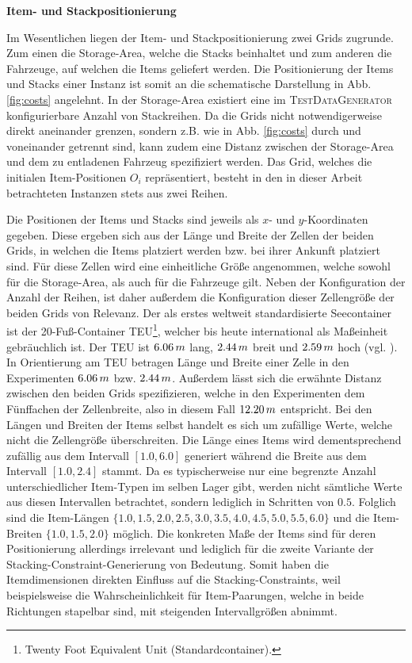 \textbf{Item- und Stackpositionierung}
\label{sec:item_stack_positioning}

Im Wesentlichen liegen der Item- und Stackpositionierung zwei Grids zugrunde. Zum einen die Storage-Area,
welche die Stacks beinhaltet und zum anderen die Fahrzeuge, auf welchen die Items geliefert werden.
Die Positionierung der Items und Stacks einer Instanz ist somit an die schematische Darstellung in Abb. \ref{fig:costs}
angelehnt. In der Storage-Area existiert eine im \textsc{TestDataGenerator} konfigurierbare Anzahl von Stackreihen.
Da die Grids nicht notwendigerweise direkt aneinander grenzen, sondern z.B. wie in Abb. \ref{fig:costs}
durch  und  voneinander getrennt sind, kann zudem eine Distanz
zwischen der Storage-Area und dem zu entladenen Fahrzeug spezifiziert werden.
Das Grid, welches die initialen Item-Positionen $O_i$ repräsentiert, besteht in den in dieser Arbeit betrachteten
Instanzen stets aus zwei Reihen.

Die Positionen der Items und Stacks sind jeweils als $x$- und $y$-Koordinaten gegeben.
Diese ergeben sich aus der Länge und Breite der Zellen der beiden Grids, in welchen die Items platziert werden
bzw. bei ihrer Ankunft platziert sind. Für diese Zellen wird eine einheitliche Größe angenommen,
welche sowohl für die Storage-Area, als auch für die Fahrzeuge gilt.
Neben der Konfiguration der Anzahl der Reihen, ist daher außerdem die Konfiguration dieser Zellengröße der beiden
Grids von Relevanz. Der als erstes weltweit standardisierte Seecontainer ist der 20-Fuß-Container TEU\footnote{Twenty Foot Equivalent Unit (Standardcontainer).}, welcher bis heute international als Maßeinheit gebräuchlich ist. Der TEU ist
$6.06 \thinspace m$ lang, $2.44 \thinspace m$ breit und $2.59 \thinspace m$ hoch (vgl. \citet{ContainerBasis}).
In Orientierung am TEU betragen Länge und Breite einer Zelle in den Experimenten $6.06 \thinspace m$ bzw.
$2.44 \thinspace m$. Außerdem lässt sich die erwähnte Distanz zwischen den beiden Grids spezifizieren,
welche in den Experimenten dem Fünffachen der Zellenbreite, also in diesem Fall $12.20 \thinspace m$ entspricht.
Bei den Längen und Breiten der Items selbst handelt es sich um zufällige Werte, welche nicht die Zellengröße überschreiten.
Die Länge eines Items wird dementsprechend zufällig aus dem Intervall $[1.0, 6.0]$ generiert während die Breite aus dem
Intervall $[1.0, 2.4]$ stammt. Da es typischerweise nur eine begrenzte Anzahl unterschiedlicher Item-Typen im selben Lager
gibt, werden nicht sämtliche Werte aus diesen Intervallen betrachtet, sondern lediglich in Schritten von $0.5$.
Folglich sind die Item-Längen $\{1.0, 1.5, 2.0, 2.5, 3.0, 3.5, 4.0, 4.5, 5.0, 5.5, 6.0\}$ und
die Item-Breiten $\{1.0, 1.5, 2.0\}$ möglich.
Die konkreten Maße der Items sind für deren Positionierung allerdings irrelevant und lediglich für
die zweite Variante der Stacking-Constraint-Generierung von Bedeutung.
Somit haben die Itemdimensionen direkten Einfluss auf die Stacking-Constraints,
weil beispielsweise die Wahrscheinlichkeit für Item-Paarungen, welche in beide Richtungen stapelbar sind,
mit steigenden Intervallgrößen abnimmt.

